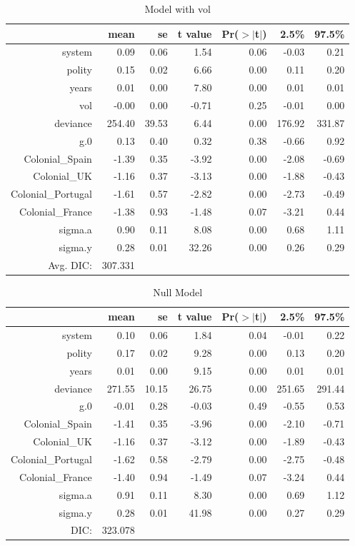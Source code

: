 \documentclass[12pt]{article}
\begin{document}
\begin{table}[ht]
\centering
\begin{tabular}{rrrrrrr}
  \hline
 & mean & se & t value & Pr($>$$|$t$|$) & 2.5\% & 97.5\% \\ 
  \hline
system & 0.09 & 0.06 & 1.54 & 0.06 & -0.03 & 0.21 \\ 
  polity & 0.15 & 0.02 & 6.66 & 0.00 & 0.11 & 0.20 \\ 
  years & 0.01 & 0.00 & 7.80 & 0.00 & 0.01 & 0.01 \\ 
  vol & -0.00 & 0.00 & -0.71 & 0.25 & -0.01 & 0.00 \\ 
  deviance & 254.40 & 39.53 & 6.44 & 0.00 & 176.92 & 331.87 \\ 
  g.0 & 0.13 & 0.40 & 0.32 & 0.38 & -0.66 & 0.92 \\ 
  Colonial\_Spain & -1.39 & 0.35 & -3.92 & 0.00 & -2.08 & -0.69 \\ 
  Colonial\_UK & -1.16 & 0.37 & -3.13 & 0.00 & -1.88 & -0.43 \\ 
  Colonial\_Portugal & -1.61 & 0.57 & -2.82 & 0.00 & -2.73 & -0.49 \\ 
  Colonial\_France & -1.38 & 0.93 & -1.48 & 0.07 & -3.21 & 0.44 \\ 
  sigma.a & 0.90 & 0.11 & 8.08 & 0.00 & 0.68 & 1.11 \\ 
  sigma.y & 0.28 & 0.01 & 32.26 & 0.00 & 0.26 & 0.29 \\ 
   \hline
Avg. DIC:&307.331\\
\hline
\end{tabular}
\caption{Model with vol} 
\end{table}

\begin{table}[ht]
\centering
\begin{tabular}{rrrrrrr}
  \hline
 & mean & se & t value & Pr($>$$|$t$|$) & 2.5\% & 97.5\% \\ 
  \hline
system & 0.10 & 0.06 & 1.84 & 0.04 & -0.01 & 0.22 \\ 
  polity & 0.17 & 0.02 & 9.28 & 0.00 & 0.13 & 0.20 \\ 
  years & 0.01 & 0.00 & 9.15 & 0.00 & 0.01 & 0.01 \\ 
  deviance & 271.55 & 10.15 & 26.75 & 0.00 & 251.65 & 291.44 \\ 
  g.0 & -0.01 & 0.28 & -0.03 & 0.49 & -0.55 & 0.53 \\ 
  Colonial\_Spain & -1.41 & 0.35 & -3.96 & 0.00 & -2.10 & -0.71 \\ 
  Colonial\_UK & -1.16 & 0.37 & -3.12 & 0.00 & -1.89 & -0.43 \\ 
  Colonial\_Portugal & -1.62 & 0.58 & -2.79 & 0.00 & -2.75 & -0.48 \\ 
  Colonial\_France & -1.40 & 0.94 & -1.49 & 0.07 & -3.24 & 0.44 \\ 
  sigma.a & 0.91 & 0.11 & 8.30 & 0.00 & 0.69 & 1.12 \\ 
  sigma.y & 0.28 & 0.01 & 41.98 & 0.00 & 0.27 & 0.29 \\ 
   \hline
DIC:&323.078\\
\hline
\end{tabular}
\caption{Null Model} 
\end{table}
\end{document}
